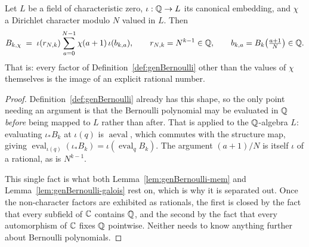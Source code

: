 \begin{lemma}
  \label{lem:genBernoulli-ratCast}
  \leanok
  Let $L$ be a field of characteristic zero, $\iota : \mathbb{Q} \to L$ its canonical embedding, and
  $\chi$ a Dirichlet character modulo $N$ valued in $L$. Then
  \[ B_{k,\chi} \;=\; \iota(r_{N,k}) \sum_{a=0}^{N-1} \chi(a+1)\, \iota(b_{k,a}),
     \qquad r_{N,k} = N^{k-1} \in \mathbb{Q}, \qquad b_{k,a} = B_k\!\left(\tfrac{a+1}{N}\right) \in \mathbb{Q}. \]
  That is: every factor of Definition~\ref{def:genBernoulli} other than the values of $\chi$
  themselves is the image of an explicit rational number.
\end{lemma}
\begin{proof}
  \leanok
  Definition~\ref{def:genBernoulli} already has this shape, so the only point needing an
  argument is that the Bernoulli polynomial may be evaluated in $\mathbb{Q}$ \emph{before} being mapped
  to $L$ rather than after. That is
   applied to the
  $\mathbb{Q}$-algebra $L$: evaluating $\iota_{*}B_k$ at $\iota(q)$ is $\operatorname{aeval}$, which
  commutes with the structure map, giving
  $\operatorname{eval}_{\iota(q)}(\iota_{*}B_k) = \iota(\operatorname{eval}_q B_k)$. The
  argument $(a+1)/N$ is itself $\iota$ of a rational, as is $N^{k-1}$.

  This single fact is what both Lemma~\ref{lem:genBernoulli-mem} and
  Lemma~\ref{lem:genBernoulli-galois} rest on, which is why it is separated out. Once the
  non-character factors are exhibited as rationals, the first is closed by the fact that every
  subfield of $\mathbb{C}$ contains $\mathbb{Q}$, and the second by the fact that every automorphism of $\mathbb{C}$
  fixes $\mathbb{Q}$ pointwise. Neither needs to know anything further about Bernoulli polynomials.
\end{proof}

